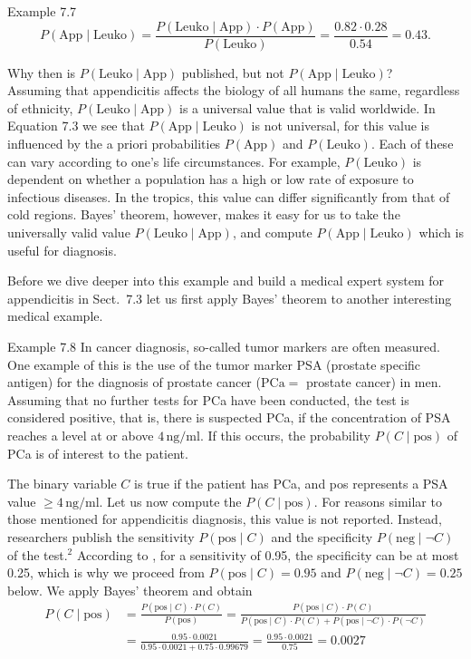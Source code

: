 \documentclass[10pt]{book}
\begin{document}
\noindent Example 7.7
\begin{equation*}
P(\text{App} \mid \text{Leuko})=\frac{P(\text{Leuko} \mid \text{App})\cdot P(\text{App})}{P(\text{Leuko})}=\frac{0.82 \cdot 0.28}{0.54}=0.43. \tag{7.3}
\end{equation*}

Why then is $P(\text{Leuko} \mid \text{App})$ published, but not $P(\text{App} \mid \text{Leuko})$?\\
Assuming that appendicitis affects the biology of all humans the same, regardless of ethnicity, $P(\text{Leuko} \mid \text{App})$ is a universal value that is valid worldwide. In Equation 7.3 we see that $P(\text{App} \mid \text{Leuko})$ is not universal, for this value is influenced by the a priori probabilities $P(\text{App})$ and $P(\text{Leuko})$. Each of these can vary according to one's life circumstances. For example, $P(\text{Leuko})$ is dependent on whether a population has a high or low rate of exposure to infectious diseases. In the tropics, this value can differ significantly from that of cold regions. Bayes' theorem, however, makes it easy for us to take the universally valid value $P(\text{Leuko} \mid \text{App})$, and compute $P(\text{App} \mid \text{Leuko})$ which is useful for diagnosis.

Before we dive deeper into this example and build a medical expert system for appendicitis in Sect.\ 7.3 let us first apply Bayes' theorem to another interesting medical example.

Example 7.8 In cancer diagnosis, so-called tumor markers are often measured. One example of this is the use of the tumor marker PSA (prostate specific antigen) for the diagnosis of prostate cancer ($\mathrm{PCa}=$ prostate cancer) in men. Assuming that no further tests for PCa have been conducted, the test is considered positive, that is, there is suspected PCa, if the concentration of PSA reaches a level at or above $4\,\mathrm{ng}/\mathrm{ml}$. If this occurs, the probability $P(C \mid \text{pos})$ of PCa is of interest to the patient.

The binary variable $C$ is true if the patient has PCa, and pos represents a PSA value $\geq 4\,\mathrm{ng}/\mathrm{ml}$. Let us now compute the $P(C \mid \text{pos})$. For reasons similar to those mentioned for appendicitis diagnosis, this value is not reported. Instead, researchers publish the sensitivity $P(\text{pos} \mid C)$ and the specificity $P(\text{neg} \mid \neg C)$ of the test.${ }^{2}$ According to \cite{hl04}, for a sensitivity of 0.95, the specificity can be at most 0.25, which is why we proceed from $P(\text{pos} \mid C)=0.95$ and $P(\text{neg} \mid \neg C)=0.25$ below. We apply Bayes' theorem and obtain
$$
\begin{aligned}
P(C \mid \text{pos}) &= \frac{P(\text{pos} \mid C)\cdot P(C)}{P(\text{pos})} = \frac{P(\text{pos} \mid C)\cdot P(C)}{P(\text{pos} \mid C)\cdot P(C)+P(\text{pos} \mid \neg C)\cdot P(\neg C)} \\
&= \frac{0.95 \cdot 0.0021}{0.95 \cdot 0.0021 + 0.75 \cdot 0.99679} = \frac{0.95 \cdot 0.0021}{0.75} = 0.0027
\end{aligned}
$$
\end{document}
